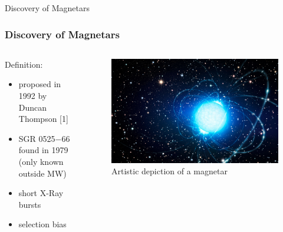 \documentclass[hyperref=pdftex, presentation]{beamer}
\begin{document}
\begin{frame}{\Large Discovery of Magnetars}
\frametitle{\Large Discovery of Magnetars}

\begin{minipage}[0.2\textheight]{\textwidth}
\begin{columns}[T]
\begin{column}{0.5\textwidth}

\begin{block}{Definition:}

\begin{itemize}
 \item<2-> proposed in 1992 by Duncan Thompson [1]
 \item<3-> SGR 0525−66 found in 1979 (only known outside MW) %
 \item<4-> short X-Ray bursts%
 \item<5-> selection bias 
\end{itemize}
\end{block}

\end{column}
\begin{column}{0.5\textwidth}
	\begin{figure}
		\includegraphics[scale=.09]{figures/magnetar_art.jpg}
		\caption{Artistic depiction of a magnetar}
	\end{figure}
\end{column}
\end{columns}
\end{minipage}

\end{frame}
\end{document}
